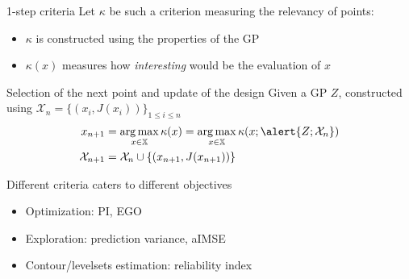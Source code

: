 \documentclass[10pt,aspectratio=169,usepdftitle=false]{beamer}
\newcommand{\Xspace}{\mathbb{X}}
\DeclareMathOperator*{\argmax}{arg\,max}
\begin{document}
 
\begin{frame}{1-step criteria}
  Let $\kappa$ be such a criterion measuring the relevancy of points:
  \begin{itemize}
  \item $\kappa$ is constructed using the properties of the GP
  \item $\kappa(x)$ measures how \emph{interesting} would be the
    evaluation of $x$
  \end{itemize}
  \begin{block}{Selection of the next point and update of the design}
      Given a GP $Z$, constructed using
      $\mathcal{X}_n = \{(x_i, J(x_i))\}_{1\leq i \leq n}$
      \begin{align}
    x_{n+1} &= \argmax_{x \in \Xspace} \kappa(x) = \argmax_{x \in \Xspace} \kappa(x; \alert{Z; \mathcal{X}_n}) \\
    \mathcal{X}_{n+1} &= \mathcal{X}_n \cup \{(x_{n+1},J(x_{n+1})) \}
  \end{align}
\end{block}
\pause
  Different criteria caters to different objectives
  \begin{itemize}
  \item Optimization: PI, EGO \citep{jones_efficient_1998,hernandez-lobato_predictive_2014}
  \item Exploration: prediction variance, aIMSE
  \item Contour/levelsets estimation: reliability index \citep{bect_sequential_2012,picheny_adaptive_2010}
  \end{itemize}
\end{frame}
\end{document}
